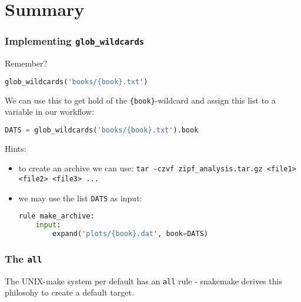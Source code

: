 \section{Summary}

\begin{frame}[fragile]
  \frametitle{Implementing \texttt{glob\_wildcards}}
  Remember?
  \begin{lstlisting}[language=Python,style=Python,basicstyle=\tiny]
glob_wildcards('books/{book}.txt')
  \end{lstlisting}
  \pause
  We can use this to get hold of the \texttt{\{book\}}-wildcard and assign this list to a variable in our workflow:
  \begin{lstlisting}[language=Python,style=Python,basicstyle=\tiny]
DATS = glob_wildcards('books/{book}.txt').book
  \end{lstlisting}
  \footnotesize
  Hints:
      \begin{itemize}
       \item to create an archive we can use: \texttt{tar -czvf zipf\_analysis.tar.gz <file1> <file2> <file3> ...}
       \item we may use the list \texttt{DATS} as input:
          \begin{lstlisting}[language=Python,style=Python,basicstyle=\tiny]
rule make_archive:
    input:
        expand('plots/{book}.dat', book=DATS)
          \end{lstlisting}
      \end{itemize}
\end{frame}

\begin{frame}[fragile]
  \frametitle{The \texttt{all}}
  The UNIX-make system per default has an \texttt{all} rule - snakemake derives this philosohy to create a default target.
\end{frame}



